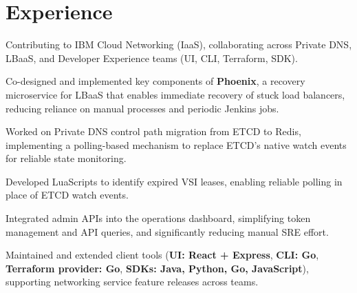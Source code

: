 \documentclass[]{deedy-resume-reversed}
\begin{document}
%
%

%
%

%
%

\begin{minipage}[t]{0.60\textwidth}



\section{Experience}
\vspace{\topsep}
\begin{tightemize}
\item Contributing to IBM Cloud Networking (IaaS), collaborating across Private DNS, LBaaS, and Developer Experience teams (UI, CLI, Terraform, SDK).
\item Co-designed and implemented key components of \textbf{Phoenix}, a recovery microservice for LBaaS that enables immediate recovery of stuck load balancers, reducing reliance on manual processes and periodic Jenkins jobs.

\item Worked on Private DNS control path migration from ETCD to Redis, implementing a polling-based mechanism to replace ETCD’s native watch events for reliable state monitoring.
\item Developed LuaScripts to identify expired VSI leases, enabling reliable polling in place of ETCD watch events.
\item Integrated admin APIs into the operations dashboard, simplifying token management and API queries, and significantly reducing manual SRE effort.
\item Maintained and extended client tools (\textbf{UI: React + Express}, \textbf{CLI: Go}, \textbf{Terraform provider: Go}, \textbf{SDKs: Java, Python, Go, JavaScript}), supporting networking service feature releases across teams.
\end{tightemize}
\sectionsep


\end{minipage}
\end{document}
